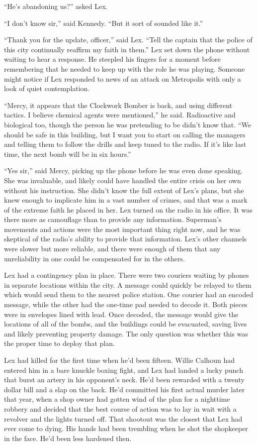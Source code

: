 ``He's abandoning us?'' asked Lex.

``I don't know sir,'' said Kennedy. ``But it sort of sounded like it.''

``Thank you for the update, officer,'' said Lex. ``Tell the captain that
the police of this city continually reaffirm my faith in them.'' Lex set
down the phone without waiting to hear a response. He steepled his
fingers for a moment before remembering that he needed to keep up with
the role he was playing. Someone might notice if Lex responded to news
of an attack on Metropolis with only a look of quiet contemplation.

``Mercy, it appears that the Clockwork Bomber is back, and using
different tactics. I believe chemical agents were mentioned,'' he said.
Radioactive and biological too, though the person he was pretending to
be didn't know that. ``We should be safe in this building, but I want
you to start on calling the managers and telling them to follow the
drills and keep tuned to the radio. If it's like last time, the next
bomb will be in six hours.''

``Yes sir,'' said Mercy, picking up the phone before he was even done
speaking. She was invaluable, and likely could have handled the entire
crisis on her own without his instruction. She didn't know the full
extent of Lex's plans, but she knew enough to implicate him in a vast
number of crimes, and that was a mark of the extreme faith he placed in
her. Lex turned on the radio in his office. It was there more as
camouflage than to provide any information. Superman's movements and
actions were the most important thing right now, and he was skeptical of
the radio's ability to provide that information. Lex's other channels
were slower but more reliable, and there were enough of them that any
unreliability in one could be compensated for in the others.

Lex had a contingency plan in place. There were two couriers waiting by
phones in separate locations within the city. A message could quickly be
relayed to them which would send them to the nearest police station. One
courier had an encoded message, while the other had the one‐time pad
needed to decode it. Both pieces were in envelopes lined with lead. Once
decoded, the message would give the locations of all of the bombs, and
the buildings could be evacuated, saving lives and likely preventing
property damage. The only question was whether this was the proper time
to deploy that plan.

Lex had killed for the first time when he'd been fifteen. Willie Calhoun
had entered him in a bare knuckle boxing fight, and Lex had landed a
lucky punch that burst an artery in his opponent's neck. He'd been
rewarded with a twenty dollar bill and a slap on the back. He'd
committed his first actual murder later that year, when a shop owner had
gotten wind of the plan for a nighttime robbery and decided that the
best course of action was to lay in wait with a revolver and the lights
turned off. That shootout was the closest that Lex had ever come to
dying. His hands had been trembling when he shot the shopkeeper in the
face. He'd been less hardened then.

